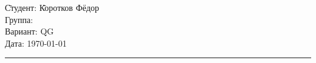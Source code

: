 \begin{tabbing}
	\hspace{11cm} \= Студент: \= Коротков Фёдор \\ %
	\> Группа:  \\  %
	\> Вариант: \> QG \\    %
	\> Дата: \> \today     %
\end{tabbing}
\hrule
\vspace{1cm}